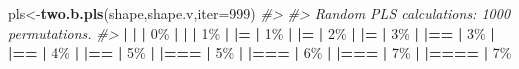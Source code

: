 \documentclass[
]{book}
\newenvironment{Shaded}{\begin{snugshade}}{\end{snugshade}}
\newcommand{\AttributeTok}[1]{\textcolor[rgb]{0.13,0.29,0.53}{#1}}
\newcommand{\CommentTok}[1]{\textcolor[rgb]{0.56,0.35,0.01}{\textit{#1}}}
\newcommand{\DecValTok}[1]{\textcolor[rgb]{0.00,0.00,0.81}{#1}}
\newcommand{\ErrorTok}[1]{\textcolor[rgb]{0.64,0.00,0.00}{\textbf{#1}}}
\newcommand{\FunctionTok}[1]{\textcolor[rgb]{0.13,0.29,0.53}{\textbf{#1}}}
\newcommand{\NormalTok}[1]{#1}
\newcommand{\OtherTok}[1]{\textcolor[rgb]{0.56,0.35,0.01}{#1}}
\newcommand{\SpecialCharTok}[1]{\textcolor[rgb]{0.81,0.36,0.00}{\textbf{#1}}}
\begin{document}
\begin{Shaded}
\begin{Highlighting}[]
\NormalTok{pls}\OtherTok{\textless{}{-}}\FunctionTok{two.b.pls}\NormalTok{(shape,shape.v,}\AttributeTok{iter=}\DecValTok{999}\NormalTok{)}
\CommentTok{\#\textgreater{} }
\CommentTok{\#\textgreater{} Random PLS calculations: 1000 permutations.}
\CommentTok{\#\textgreater{} }
  \SpecialCharTok{|}                                                        
  \ErrorTok{|}                                                  \ErrorTok{|}   \DecValTok{0}\NormalTok{\%}
  \SpecialCharTok{|}                                                        
  \ErrorTok{|}                                                  \ErrorTok{|}   \DecValTok{1}\NormalTok{\%}
  \SpecialCharTok{|}                                                        
  \ErrorTok{|=}                                                 \ErrorTok{|}   \DecValTok{1}\NormalTok{\%}
  \SpecialCharTok{|}                                                        
  \ErrorTok{|=}                                                 \ErrorTok{|}   \DecValTok{2}\NormalTok{\%}
  \SpecialCharTok{|}                                                        
  \ErrorTok{|=}                                                 \ErrorTok{|}   \DecValTok{3}\NormalTok{\%}
  \SpecialCharTok{|}                                                        
  \ErrorTok{|==}                                                \ErrorTok{|}   \DecValTok{3}\NormalTok{\%}
  \SpecialCharTok{|}                                                        
  \ErrorTok{|==}                                                \ErrorTok{|}   \DecValTok{4}\NormalTok{\%}
  \SpecialCharTok{|}                                                        
  \ErrorTok{|==}                                                \ErrorTok{|}   \DecValTok{5}\NormalTok{\%}
  \SpecialCharTok{|}                                                        
  \ErrorTok{|===}                                               \ErrorTok{|}   \DecValTok{5}\NormalTok{\%}
  \SpecialCharTok{|}                                                        
  \ErrorTok{|===}                                               \ErrorTok{|}   \DecValTok{6}\NormalTok{\%}
  \SpecialCharTok{|}                                                        
  \ErrorTok{|===}                                               \ErrorTok{|}   \DecValTok{7}\NormalTok{\%}
  \SpecialCharTok{|}                                                        
  \ErrorTok{|====}                                              \ErrorTok{|}   \DecValTok{7}\NormalTok{\%}

\end{Highlighting}
\end{Shaded}
\end{document}
